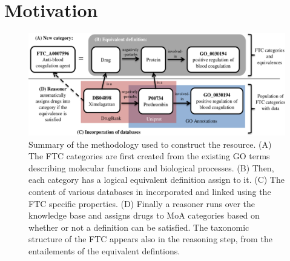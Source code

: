 \documentclass{bioinfo}
\begin{document}
\section{Motivation}

\begin{figure}[!tpb]%
\centerline{\includegraphics{fig1.png}}
\caption{Summary of the methodology used to construct the resource. (A) The FTC categories are first created from the existing GO terms
describing molecular functions and biological processes. (B) Then, each category has a logical equivalent definition assign to it.
(C) The content of various databases in incorporated and linked using the FTC specific properties. (D) Finally a reasoner runs over the knowledge
base and assigns drugs to MoA categories based on whether or not a definition can be satisfied. The taxonomic structure of the
FTC appears also in the reasoning step, from the entailements of the equivalent defintions.}\label{fig:01}
\end{figure}
\end{document}
